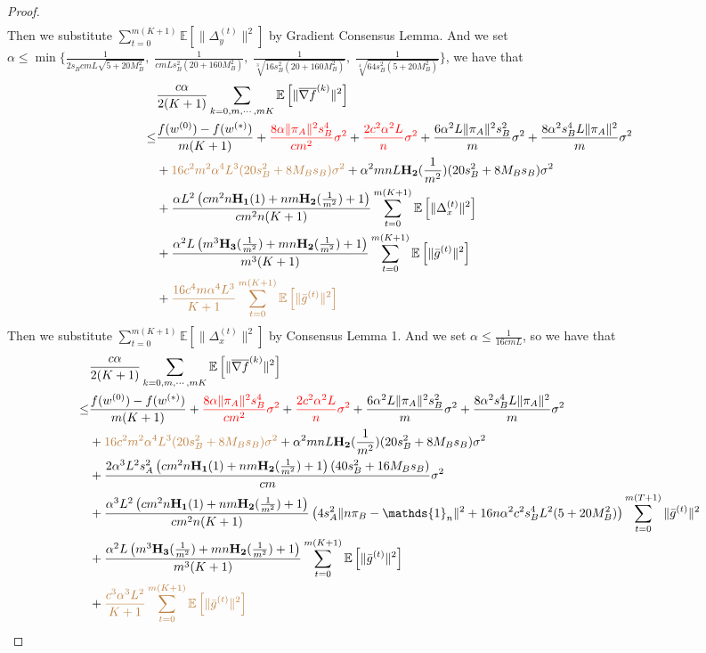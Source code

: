\documentclass{article}
\newcommand{\EE}[1]{\mathbb{E}\left[#1\right]}
\newcommand{\norm}[1]{\| #1 \|}
\newcommand{\one}{\mathds{1}_n}
\begin{document}
\begin{proof}
\begin{align*}
  \end{align*}
  Then we substitute $\sum_{t=0}^{m(K+1)}\EE{\norm{\Delta_y^{(t)}}^2}$ by Gradient Consensus Lemma. And we set $\alpha \leq \min\{\frac{1}{2s_BcmL\sqrt{5+20M_B^2}},\; \frac{1}{cmLs_B^2(20+160M_B^2)},\; \frac{1}{\sqrt[3]{16s_B^2(20+160M_B^2)}},\;\frac{1}{\sqrt[4]{64s_B^2(5+20M_B^2)}}\}$, we have that 
  \begin{align*}
    &\frac{c\alpha }{2(K+1)}\sum_{k=0,m,\cdots,mK}\EE{\norm{\overline{\nabla f}^{(k)}}^2}
  \\\leq& \frac{f(w^{(0)})-f(w^{(*)})}{m(K+1)}+\textcolor{red}{\frac{8\alpha \norm{\pi_A}^2s_B^4}{cm^2}\sigma^2}+\textcolor{red}{ \frac{2c^2\alpha^2L}{n}\sigma^2}+\frac{6\alpha^2L\norm{\pi_A}^2s_B^2}{m}\sigma^2+\frac{8\alpha^2s_B^4L\norm{\pi_A}^2}{m}\sigma^2\\&+\textcolor{brown}{16c^2m^2\alpha^4L^3(20s_B^2+8M_Bs_B)\sigma^2}+\alpha^2 mnL \mathbf{H_2}(\frac{1}{m^2})(20s_B^2+8M_Bs_B)\sigma^2\\&+\frac{\alpha L^2\left(cm^2n\mathbf{H_1}(1)+nm\mathbf{H_2}(\frac{1}{m^2})+1\right)}{cm^2n(K+1)}\sum_{t=0}^{m(K+1)}\EE{\norm{\Delta_x^{(t)}}^2}\\&+\frac{\alpha^2L\left(m^3\mathbf{H_3}(\frac{1}{m^2})+mn\mathbf{H_2}(\frac{1}{m^2})+1\right)}{m^3(K+1)}\sum_{t=0}^{m(K+1)} \EE{\norm{\bar{g}^{(t)}}^2}\\&+\textcolor{brown}{\frac{16c^4m\alpha^4L^3}{K+1}\sum_{t=0}^{m(K+1)}\EE{\norm{\bar{g}^{(t)}}^2}}
  \end{align*}
  Then we substitute $\sum_{t=0}^{m(K+1)}\EE{\norm{\Delta_x^{(t)}}^2}$ by Consensus Lemma 1. And we set $\alpha \leq \frac{1}{16cmL}$, so we have that 
  \begin{align*}
    &\frac{c\alpha }{2(K+1)}\sum_{k=0,m,\cdots,mK}\EE{\norm{\overline{\nabla f}^{(k)}}^2}
  \\\leq& \frac{f(w^{(0)})-f(w^{(*)})}{m(K+1)}+\textcolor{red}{\frac{8\alpha \norm{\pi_A}^2s_B^4}{cm^2}\sigma^2}+\textcolor{red}{ \frac{2c^2\alpha^2L}{n}\sigma^2}+\frac{6\alpha^2L\norm{\pi_A}^2s_B^2}{m}\sigma^2+\frac{8\alpha^2s_B^4L\norm{\pi_A}^2}{m}\sigma^2\\&+\textcolor{brown}{16c^2m^2\alpha^4L^3(20s_B^2+8M_Bs_B)\sigma^2}+\alpha^2 mnL \mathbf{H_2}(\frac{1}{m^2})(20s_B^2+8M_Bs_B)\sigma^2\\ &+\frac{2\alpha^3 L^2s_A^2\left(cm^2n\mathbf{H_1}(1)+nm\mathbf{H_2}(\frac{1}{m^2})+1\right)(40s_B^2+16M_Bs_B)}{cm}\sigma^2\\&+\frac{\alpha^3 L^2\left(cm^2n\mathbf{H_1}(1)+nm\mathbf{H_2}(\frac{1}{m^2})+1\right)}{cm^2n(K+1)}\left(4s_A^2\norm{n\pi_B-\one}^2+16n\alpha^2c^2s_B^4L^2(5+20M_B^2)\right) \sum_{t=0}^{m(T+1)}\norm{\bar{g}^{(t)}}^2\\&+\frac{\alpha^2L\left(m^3\mathbf{H_3}(\frac{1}{m^2})+mn\mathbf{H_2}(\frac{1}{m^2})+1\right)}{m^3(K+1)}\sum_{t=0}^{m(K+1)} \EE{\norm{\bar{g}^{(t)}}^2}\\&+\textcolor{brown}{\frac{c^3\alpha^3L^2}{K+1}\sum_{t=0}^{m(K+1)}\EE{\norm{\bar{g}^{(t)}}^2}}

\end{align*}
\end{proof}
\end{document}

